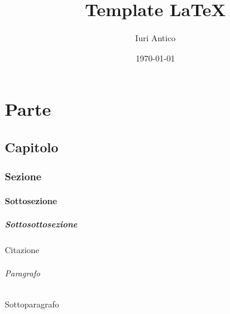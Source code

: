 \documentclass[12pt]{report}
\title{Template \LaTeX}
\author{Iuri Antico}
\date{\today}
\begin{document}
	
	\begin{titlepage}
		\maketitle
	\end{titlepage}
	
	\tableofcontents
	
	\part{Parte}
	\chapter{Capitolo}
	\section{Sezione}
	\subsection{Sottosezione}
	\subsubsection{Sottosottosezione}
	Citazione \cite{IuriTex}

	\paragraph{Paragrafo}
	\subparagraph{Sottoparagrafo}
	
	
	
\end{document}
